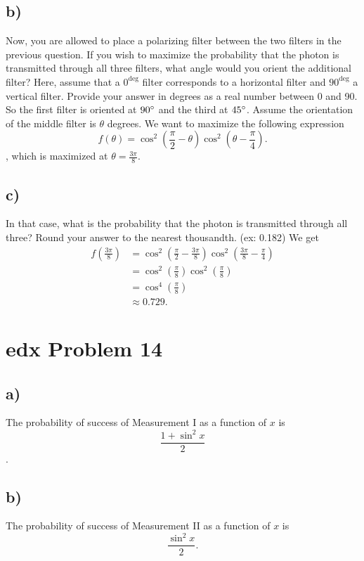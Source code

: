 \documentclass[10pt]{article}
\begin{document}
\subsection*{b)}
\color{blue} Now, you are allowed to place a polarizing filter between the two filters in the previous question. If you wish to maximize the probability that the photon is transmitted through all three filters, what angle would you orient the additional filter? Here, assume that a $0^{\deg}$ filter corresponds to a horizontal filter and $90^{\deg}$ a vertical filter. Provide your answer in degrees as a real number between 0 and 90.
\color{black} So the first filter is oriented at $90\degree$ and the third at $45\degree$. Assume the orientation of the middle filter is $\theta$ degrees. We want to maximize the following expression \[
f(\theta) = \cos^2 (\frac{\pi}{2} - \theta)\cos^2 (\theta - \frac{\pi}{4}).
\], which is maximized at $\theta = \frac{3\pi}{8}$.

\subsection*{c)}
\color{blue} In that case, what is the probability that the photon is transmitted through all three? Round your answer to the nearest thousandth. (ex: 0.182)
\color{black} We get 
\begin{align*}
f(\frac{3\pi}{8}) &= \cos^2 (\frac{\pi}{2} - \frac{3\pi}{8}) \cos^2 (\frac{3\pi}{8} - \frac{\pi}{4}) \\
                        &= \cos^2 (\frac{\pi}{8}) \cos^2 (\frac{\pi}{8}) \\
                        &= \cos^4(\frac{\pi}{8}) \\
                        &\approx 0.729.
\end{align*}

\section*{edx Problem 14}
\subsection*{a)}
The probability of success of Measurement I as a function of $x$ is
\[
\frac{1 + \sin^2 x}{2}
\].

\subsection*{b)} 
The probability of success of Measurement II as a function of $x$ is 
\[
\frac{\sin^2 x}{2}.
\]
\end{document}
